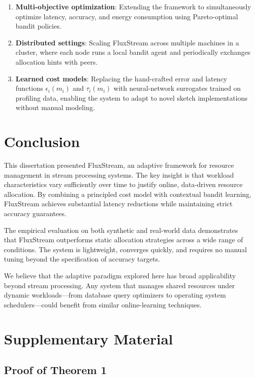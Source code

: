 \documentclass[
    language=english,
    doctype=dissertation,
    institution=none,
    titlestyle=book,
]{../../omnilatex}
\begin{document}
\begin{enumerate}
    \item \textbf{Multi-objective optimization}: Extending the framework to simultaneously optimize latency, accuracy, and energy consumption using Pareto-optimal bandit policies.
    \item \textbf{Distributed settings}: Scaling FluxStream across multiple machines in a cluster, where each node runs a local bandit agent and periodically exchanges allocation hints with peers.
    \item \textbf{Learned cost models}: Replacing the hand-crafted error and latency functions $\epsilon_i(m_i)$ and $\tau_i(m_i)$ with neural-network surrogates trained on profiling data, enabling the system to adapt to novel sketch implementations without manual modeling.
\end{enumerate}

\chapter{Conclusion}\label{ch:conclusion}

This dissertation presented FluxStream, an adaptive framework for resource management in stream processing systems. The key insight is that workload characteristics vary sufficiently over time to justify online, data-driven resource allocation. By combining a principled cost model with contextual bandit learning, FluxStream achieves substantial latency reductions while maintaining strict accuracy guarantees.

The empirical evaluation on both synthetic and real-world data demonstrates that FluxStream outperforms static allocation strategies across a wide range of conditions. The system is lightweight, converges quickly, and requires no manual tuning beyond the specification of accuracy targets.

We believe that the adaptive paradigm explored here has broad applicability beyond stream processing. Any system that manages shared resources under dynamic workloads---from database query optimizers to operating system schedulers---could benefit from similar online-learning techniques.

\appendix
\chapter{Supplementary Material}\label{app:supplementary}

\section{Proof of Theorem 1}
\end{document}
